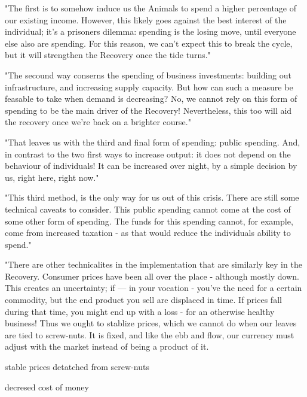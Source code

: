 "The first is to somehow induce us the Animals to spend a higher percentage of our existing income. However, this likely goes against the best interest of the individual; it's a prisoners dilemma: spending is the losing move, until everyone else also are spending. For this reason, we can't expect this to break the cycle, but it will strengthen the Recovery once the tide turns."


"The secound way conserns the spending of business investments: building out infrastructure, and increasing supply capacity. But how can such a measure be feasable to take when demand is decreasing? No, we cannot rely on this form of spending to be the main driver of the Recovery! Nevertheless, this too will aid the recovery once we're back on a brighter course."


"That leaves us with the third and final form of spending: public spending. And, in contrast to the two first ways to increase output: it does not depend on the behaviour of individuals! It can be increased over night, by a simple decision by us, right here, right now."

"This third method, is the only way for us out of this crisis. There are still some technical caveats to consider. This public spending cannot come at the cost of some other form of spending. The funds for this spending cannot, for example, come from increased taxation - as that would reduce the individuals ability to spend."

"There are other technicalites in the implementation that are similarly key in the Recovery. Consumer prices have been all over the place - although mostly down. This creates an uncertainty; if — in your vocation - you've the need for a certain commodity, but the end product you sell are displaced in time. If prices fall during that time, you might end up with a loss - for an otherwise healthy business!
 Thus we ought to stablize prices, which we cannot do when our leaves are tied to screw-nuts. It is fixed, and like the ebb and flow, our currency must adjust with the market instead of being a product of it.

 



stable prices detatched from screw-nuts

decresed cost of money


